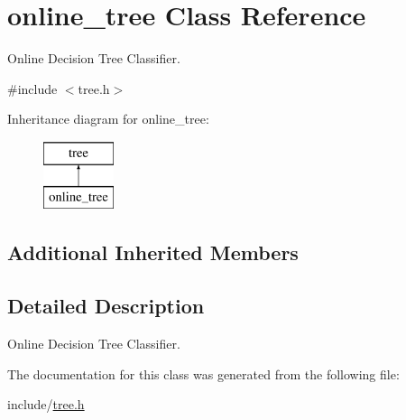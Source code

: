\hypertarget{classonline__tree}{\section{online\+\_\+tree Class Reference}
\label{classonline__tree}
}


Online Decision Tree Classifier.  




{\ttfamily \#include $<$tree.\+h$>$}

Inheritance diagram for online\+\_\+tree\+:\begin{figure}[H]
\begin{center}
\leavevmode
\includegraphics[height=2.000000cm]{classonline__tree}
\end{center}
\end{figure}
\subsection*{Additional Inherited Members}


\subsection{Detailed Description}
Online Decision Tree Classifier. 

The documentation for this class was generated from the following file\+:\begin{DoxyCompactItemize}
\item 
include/\hyperlink{tree_8h}{tree.\+h}\end{DoxyCompactItemize}
